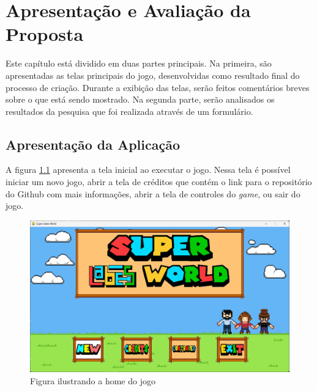 \chapter{Apresentação e Avaliação da Proposta}
\label{sec-avaliacao}



Este capítulo está dividido em duas partes principais. Na primeira, são apresentadas as telas principais do jogo, desenvolvidas como resultado final do processo de criação. Durante a exibição das telas, serão feitos comentários breves sobre o que está sendo mostrado. Na segunda parte, serão analisados os resultados da pesquisa que foi realizada através de um formulário. 

\section{Apresentação da Aplicação}
A figura \ref{fig:home-super-labes-world} apresenta a tela inicial ao executar o jogo. Nessa tela é possível iniciar um novo jogo, abrir a tela de créditos que contém o link para o repositório do Github com mais informações, abrir a tela de controles do \textit{game}, ou sair do jogo.
\begin{figure}[h!]
    \centering
    \includegraphics[width=1\linewidth]{figuras/home-super-labes-world.png}
    \caption{Figura ilustrando a home do jogo}
    \label{fig:home-super-labes-world}
\end{figure}


